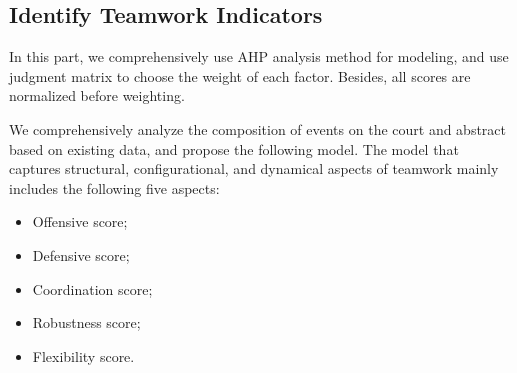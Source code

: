 \documentclass{mcmthesis}
\begin{document}
\subsection{Identify Teamwork Indicators}
	In this part, we comprehensively use AHP analysis method for modeling, and use judgment matrix to choose the weight of each factor. Besides, all scores are normalized before weighting.

	We comprehensively analyze the composition of events on the court and abstract based on existing data, and propose the following model.  The model that captures structural, configurational, and dynamical aspects of teamwork mainly includes the following five aspects:
	\begin{itemize}
		\item Offensive score;
		\item Defensive score;
		\item Coordination score;
		\item Robustness score;
		\item Flexibility score.
	\end{itemize}
\end{document}
